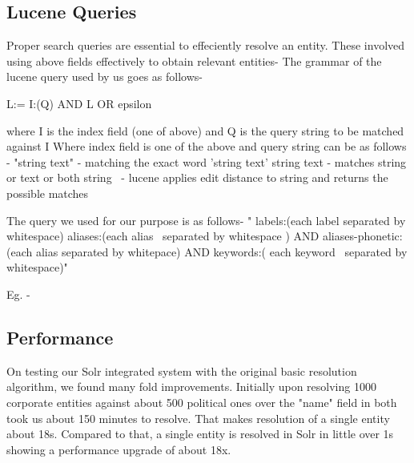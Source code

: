 \subsection{Lucene Queries}
    Proper search queries are essential to effeciently resolve an entity. These involved using above fields effectively to obtain relevant entities- 
    The grammar of the lucene query used by us goes as follows-

    L:= I:(Q) AND L OR epsilon

    where I is the index field (one of above) and Q is the query string to be matched against I
    Where index field is one of the above and query string can be as follows -
    "string text" - matching the exact word 'string text'
    string text - matches string or text or both
    string~ - lucene applies edit distance to string and returns the possible matches

    The query we used for our purpose is as follows-
    " labels:(each label separated by whitespace) aliases:(each alias~ separated by whitespace ) AND aliases-phonetic:(each alias separated by whitepace) AND keywords:( each keyword~ separated by whitespace)"

    Eg. - 
\subsection{Performance}
    On testing our Solr integrated system with the original basic resolution algorithm, we found many fold improvements. Initially upon resolving 1000 corporate entities against about 500 political ones over the "name" field in both took us about 150 minutes to resolve. That makes resolution of a single entity about 18s.
    Compared to that, a single entity is resolved in Solr in little over 1s showing a performance upgrade of about 18x.




